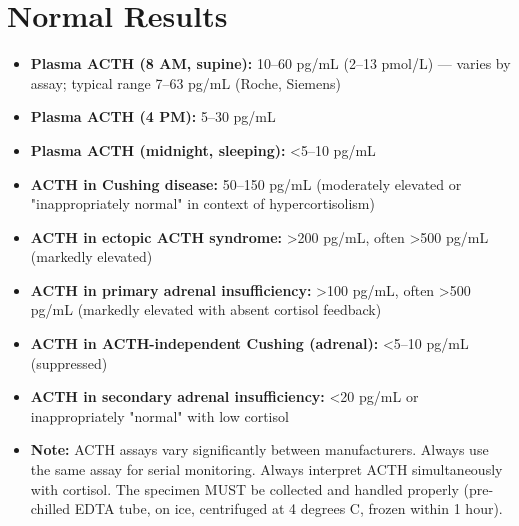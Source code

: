 \section*{Normal Results}
\begin{itemize}
  \item \textbf{Plasma ACTH (8 AM, supine):} 10--60 pg/mL (2--13 pmol/L) --- varies by assay; typical range 7--63 pg/mL (Roche, Siemens)
  \item \textbf{Plasma ACTH (4 PM):} 5--30 pg/mL
  \item \textbf{Plasma ACTH (midnight, sleeping):} <5--10 pg/mL
  \item \textbf{ACTH in Cushing disease:} 50--150 pg/mL (moderately elevated or "inappropriately normal" in context of hypercortisolism)
  \item \textbf{ACTH in ectopic ACTH syndrome:} >200 pg/mL, often >500 pg/mL (markedly elevated)
  \item \textbf{ACTH in primary adrenal insufficiency:} >100 pg/mL, often >500 pg/mL (markedly elevated with absent cortisol feedback)
  \item \textbf{ACTH in ACTH-independent Cushing (adrenal):} <5--10 pg/mL (suppressed)
  \item \textbf{ACTH in secondary adrenal insufficiency:} <20 pg/mL or inappropriately "normal" with low cortisol
  \item \textbf{Note:} ACTH assays vary significantly between manufacturers. Always use the same assay for serial monitoring. Always interpret ACTH simultaneously with cortisol. The specimen MUST be collected and handled properly (pre-chilled EDTA tube, on ice, centrifuged at 4 degrees C, frozen within 1 hour).
\end{itemize}

